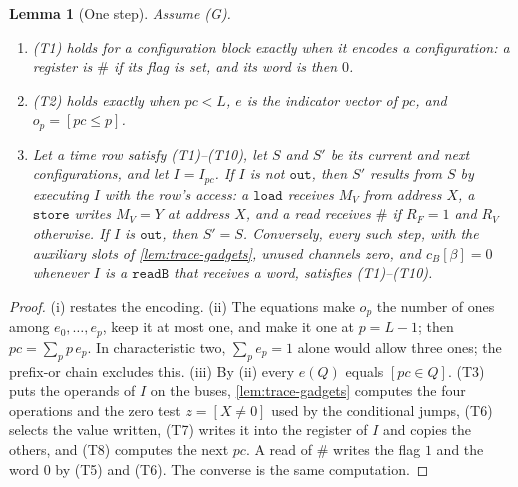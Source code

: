 \documentclass[11pt,letterpaper]{article}
\newtheorem{lemma}[theorem]{Lemma}
\theoremstyle{definition}
\theoremstyle{remark}
\begin{document}
\begin{lemma}[One step]\label{lem:trace-step}
Assume (G).
\begin{enumerate}[label=(\roman*)]
\item (T1) holds for a configuration block exactly when it encodes a
configuration: a register is \(\#\) if its flag is set, and its word is
then \(0\).
\item (T2) holds exactly when \(\mathit{pc}<L\), \(e\) is the indicator
vector of \(\mathit{pc}\), and \(o_p=[\mathit{pc}\le p]\).
\item Let a time row satisfy (T1)--(T10), let \(S\) and \(S'\) be its
current and next configurations, and let \(I=I_{\mathit{pc}}\). If \(I\)
is not \(\mathtt{out}\), then \(S'\) results from \(S\) by executing
\(I\) with the row's access: a \(\mathtt{load}\) receives \(M_V\) from
address \(X\), a \(\mathtt{store}\) writes \(M_V=Y\) at address \(X\),
and a read receives \(\#\) if \(R_F=1\) and \(R_V\) otherwise. If \(I\)
is \(\mathtt{out}\), then \(S'=S\). Conversely, every such step, with
the auxiliary slots of \cref{lem:trace-gadgets}, unused channels zero,
and \(c_B[\beta]=0\) whenever \(I\) is a \(\mathtt{readB}\) that receives a
word, satisfies (T1)--(T10).
\end{enumerate}
\end{lemma}
\begin{proof}
(i) restates the encoding. (ii) The equations make \(o_p\) the number
of ones among \(e_0,\ldots,e_p\), keep it at most one, and make it one
at \(p=L-1\); then \(\mathit{pc}=\sum_pp\,e_p\). In characteristic two,
\(\sum_pe_p=1\) alone would allow three ones; the prefix-or chain
excludes this. (iii) By (ii) every \(e(Q)\) equals
\([\mathit{pc}\in Q]\). (T3) puts the operands of \(I\) on the buses,
\cref{lem:trace-gadgets} computes the four operations and the zero test
\(z=[X\ne0]\) used by the conditional jumps, (T6) selects the value
written, (T7) writes it into the register of \(I\) and copies the
others, and (T8) computes the next \(\mathit{pc}\). A read of \(\#\)
writes the flag \(1\) and the word \(0\) by (T5) and (T6). The converse
is the same computation.
\end{proof}
\end{document}
